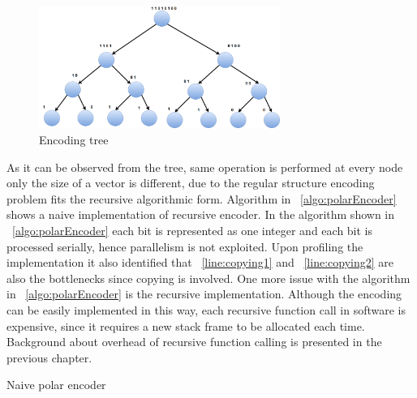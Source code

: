 \begin{figure}[]
	\centering
	\includegraphics[width=0.7\textwidth]{./figures/treeEncoding.pdf}
	\caption{Encoding tree}
	\label{fig:treeEncoding}
\end{figure}

As it can be observed from the tree, same operation is performed at every node only the size of a vector is different, due to the regular structure encoding problem fits the recursive algorithmic form. Algorithm in ~\ref{algo:polarEncoder} shows a naive implementation of recursive encoder. In the algorithm shown in ~\ref{algo:polarEncoder} each bit is represented as one integer and each bit is processed serially, hence parallelism is not exploited. Upon profiling the implementation it also identified that ~\ref{line:copying1} and ~\ref{line:copying2} are also the bottlenecks since copying is involved. One more issue with the algorithm in ~\ref{algo:polarEncoder} is the recursive implementation. Although the encoding can be easily implemented in this way, each recursive function call in software is expensive, since it requires a new stack frame to be allocated each time. Background about overhead of recursive function calling is presented in the previous chapter.

\IncMargin{1.5em}
\begin{algorithm}[!h]
	\caption{Naive polar encoder}
	\label{algo:polarEncoder}	
\end{algorithm}
\DecMargin{1.5em}

